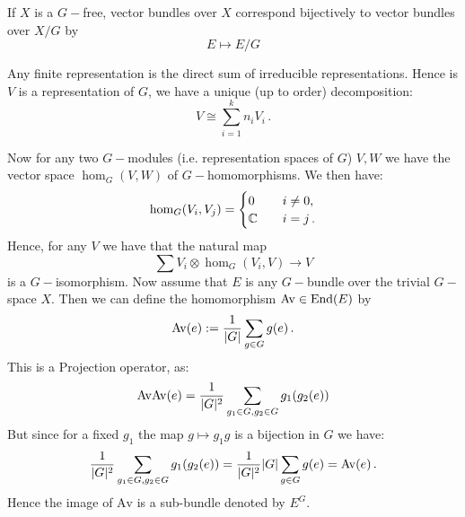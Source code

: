 \begin{remark}
	If $X$ is a $G-$free, vector bundles over $X$ correspond bijectively to vector bundles over $X\slash G$ by 
	\begin{equation*}
		E\mapsto E\slash G
	\end{equation*}
\end{remark}
\newpage
\begin{fact}
	Any finite representation is the direct sum of irreducible representations. Hence is $V$ is a representation of $G$, we have a unique (up to order) decomposition:
	\begin{equation*}
		V\cong \sum_{i=1}^kn_iV_i\, .
	\end{equation*}
\end{fact}
\begin{corollary}
	Now for any two $G-$modules (i.e. representation spaces of $G$) $V,W$ we have the vector space $\hom_G(V,W)$ of $G-$homomorphisms. We then have:
	\begin{align*}
		\hom_G(V_i,V_j)=\begin{cases}
			0 &\quad i\neq 0 ,\\
			\mathbb{C} &\quad i=j \, .
		\end{cases}
	\end{align*}
	Hence, for any $V$ we have that the natural map
	\begin{equation*}
		\sum V_i \otimes \hom_G(V_i,V)\to V
	\end{equation*} is a $G-$isomorphism. Now assume that $E$ is any $G-$bundle over the trivial $G-$space $X$. Then we can define the homomorphism $\mathrm{Av}\in \operatorname{\mathrm{End}}(E)$ by
	\begin{align*}
		\mathrm{Av}(e):=\frac{1}{\lvert G\rvert}\sum_{g\in G}g(e)\, .
	\end{align*} This is a Projection operator, as:
	\begin{align*}
		\mathrm{Av}\mathrm{Av}(e)=\frac{1}{\lvert G\rvert^2}\sum_{g_1\in G,g_2 \in G}g_1(g_2(e))
	\end{align*} But since for a fixed $g_1$ the map $g\mapsto g_1 g$ is a bijection in $G$ we have:
	\begin{align*}
		\frac{1}{\lvert G\rvert^2}\sum_{g_1\in G,g_2 \in G}g_1(g_2(e))=\frac{1}{\lvert G\rvert^2}\lvert G\rvert\sum_{g \in G}g(e)=\mathrm{Av}(e)\, .
	\end{align*} Hence the image of $\mathrm{Av}$ is a sub-bundle denoted by $E^G$.
\end{corollary}


